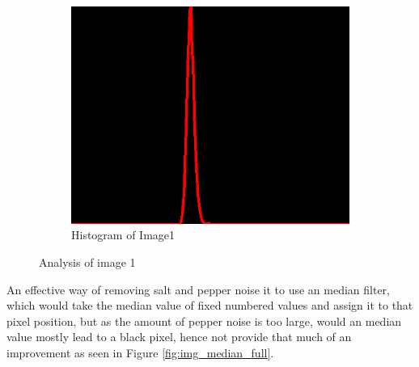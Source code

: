 \begin{figure}[H]
\begin{subfigure}[b]{0.446\textwidth}
        \includegraphics[width=\textwidth]{img1/src_hist.png}
        \caption{Histogram of Image1}
        \label{fig:img1_hist}
    \end{subfigure}
    \caption{Analysis of image 1}\label{fig:img1}
\end{figure}

An effective way of removing salt and pepper noise it to use an median filter, which would take the median value  of fixed numbered  values and assign it to that pixel position, but as the amount of pepper noise is too large, would an median value mostly lead to a black pixel, hence not provide that much of an improvement as seen in Figure \ref{fig:img_median_full}.  

